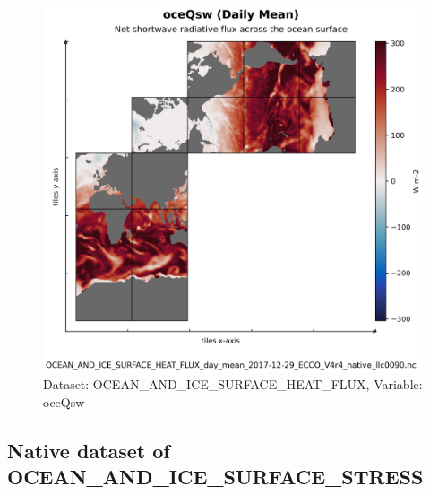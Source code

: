 \begin{figure}[H]
\centering
\includegraphics[scale=0.55]{../images/plots/native_plots/Ocean_and_Sea-Ice_Surface_Heat_Fluxes/oceQsw.png}
\caption{Dataset: OCEAN\_AND\_ICE\_SURFACE\_HEAT\_FLUX, Variable: oceQsw}
\label{tab:table-OCEAN_AND_ICE_SURFACE_HEAT_FLUX_oceQsw-Plot}
\end{figure}
\subsection{Native dataset of OCEAN\_AND\_ICE\_SURFACE\_STRESS}
\newp
